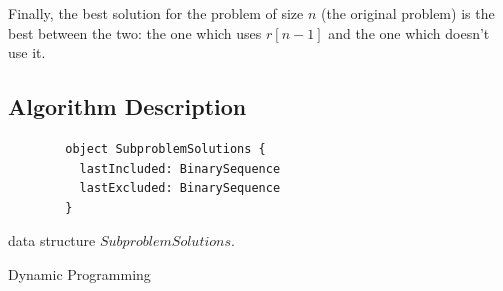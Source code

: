 Finally, the best solution for the problem of size $n$ (the original problem) is the best between the two: the one which uses $r[n-1]$ and the one which doesn't use it.

\subsection{Algorithm Description}

\begin{algorithm}
    \begin{lstlisting}
        object SubproblemSolutions {
          lastIncluded: BinarySequence
          lastExcluded: BinarySequence
        }
    \end{lstlisting}
    \caption{data structure $SubproblemSolutions$.}
\end{algorithm}

\begin{algorithm}[H]
    \caption{Dynamic Programming}
    \label{burglar's-night-out:algorithm:dynamic-programming}
    \begin{algorithmic}[1]
        \EndFor{}
    \end{algorithmic}
\end{algorithm}
